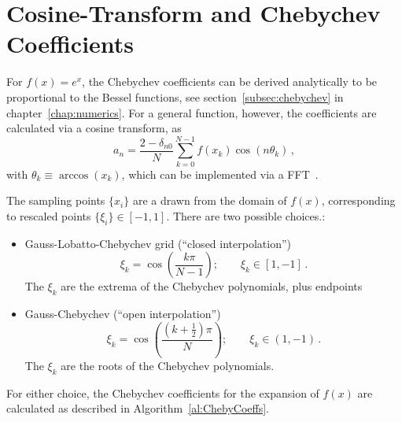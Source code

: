 \section{Cosine-Transform and Chebychev Coefficients}

For $f(x) = e^{x}$, the Chebychev coefficients can be derived analytically
to be proportional to the Bessel functions, see
section~\ref{subsec:chebychev} in chapter~\ref{chap:numerics}. For a general
function, however, the coefficients are calculated via a cosine transform,
as~\cite{NdongJCP09}
\begin{equation}
  a_n = \frac{2 - \delta_{n0}}{N} \sum_{k=0}^{N-1} f(x_k) \cos(n \theta_k)\,,
\end{equation}
with $\theta_k \equiv \arccos(x_k)$, which can be implemented via a
FFT~\cite{RaoDCTBook1990}.

The sampling points $\{x_i\}$ are a drawn from the domain of $f(x)$,
corresponding to rescaled points $\{\xi_i\} \in [-1,1]$. There are two possible
choices.:
\begin{itemize}
  \item Gauss-Lobatto-Chebychev grid
        (``closed interpolation'')
  \begin{equation}
    \xi_k = \cos\left( \frac{k \pi}{N-1}
                \right); \qquad \xi_k \in [1, -1]\,.
    \label{eq:gauss_lobatto}
  \end{equation}
  The $\xi_k$ are the extrema of the Chebychev polynomials, plus
  endpoints
  \item Gauss-Chebychev (``open interpolation'')
  \begin{equation}
    \xi_k = \cos\left( \frac{\left(k + \frac{1}{2}\right) \pi}{N}
                \right); \qquad \xi_k \in (1, -1)\,.
    \label{eq:gauss_cheby}
  \end{equation}
  The $\xi_k$ are the roots of the Chebychev polynomials.
\end{itemize}
For either choice, the Chebychev coefficients for the expansion of $f(x)$ are
calculated as described in Algorithm~\ref{al:ChebyCoeffs}.

